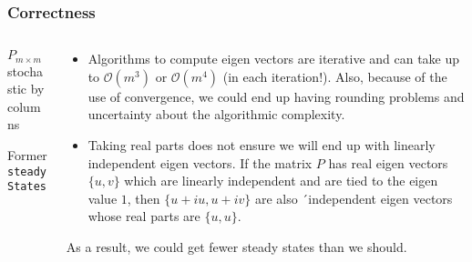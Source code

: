 \begin{frame}[fragile] \frametitle{Correctness}
    \begin{columns}
    \begin{column}{0.5\textwidth}

        \begin{algorithm}[H]
        \begin{algorithmic}[1]
        \REQUIRE $P_{m \times m}$ stochastic by columns
        \ENDFOR
        \NEWLINE
        \end{algorithmic}
        \caption{Former \small\texttt{steadyStates}}
        \label{alg:computeSteadyStatesFirst}
        \end{algorithm}
    \end{column}
    \begin{column}{0.5\textwidth}
        \vspace{2em}
        \begin{itemize}
        \item Algorithms to compute eigen vectors are iterative and can take up to 
        $\mathcal{O}(m^3)$ or $\mathcal{O}(m^4)$ (in each iteration!). Also, because of 
        the use of convergence, we could end up having rounding problems and uncertainty
        about the algorithmic complexity.
        \item Taking real parts does not ensure we will end up with linearly independent 
        eigen vectors. If the matrix $P$ has real eigen vectors $\{u, v\}$ which are 
        linearly independent and are tied to the eigen value $1$, then 
        $\{u + iu, u + iv\}$ are also ´independent eigen vectors whose real parts are 
        $\{u,u\}$. 
        \end{itemize}
        As a result, we could get fewer steady states than we should.
    \end{column}
    \end{columns}
\end{frame}


